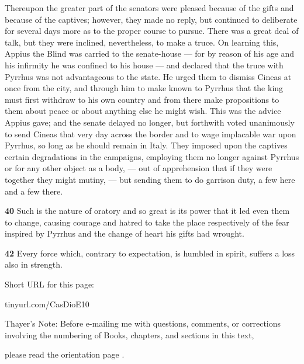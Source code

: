 Thereupon the greater part of the senators were pleased because of the gifts and because of the captives; however, they made no reply, but continued to deliberate for several days more as to the proper course to pursue. There was a great deal of talk, but they were inclined, nevertheless, to make a truce. On learning this, Appius the Blind was carried to the senate-house \texthebrew{—} for by reason of his age and his infirmity he was confined to his house \texthebrew{—} and declared that the truce with Pyrrhus was not advantageous to the state. He urged them to dismiss Cineas at once from the city, and through him to make known to Pyrrhus that the king must first withdraw to his own country and from there make propositions to them about peace or about anything else he might wish. This was the advice Appius gave; and the senate delayed no longer, but forthwith voted unanimously to send Cineas that very day across the border and to wage implacable war upon Pyrrhus, so long as he should remain in Italy. They imposed upon the captives certain degradations in the campaigns, employing them no longer against Pyrrhus or for any other object as a body, \texthebrew{—} out of apprehension that if they were together they might mutiny, \texthebrew{—} but sending them to do garrison duty, a few here and a few there.

\textbf{40} Such is the nature of oratory and so great is its power that it led even them to change, causing courage and hatred to take the place respectively of the fear inspired by Pyrrhus and the change of heart his gifts had wrought.

\textbf{42} Every force which, contrary to expectation, is humbled in spirit, suffers a loss also in strength.


Short URL for this page:

tinyurl.com/CasDioE10

Thayer's Note: Before e-mailing me with questions, comments, or corrections involving the numbering of Books, chapters, and sections in this text,

please read the orientation page .


